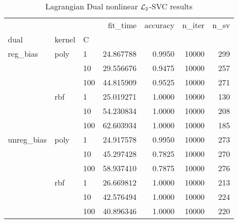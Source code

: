 \begin{table}[H]
\centering
\caption{Lagrangian Dual nonlinear $\protect \mathcal{L}_2$-SVC results}
\label{nonlinear_lagrangian_dual_l2_svc_cv_results}
\begin{tabular}{lllrrrr}
\toprule
           &     &     &   fit\_time &  accuracy &  n\_iter &  n\_sv \\
dual & kernel & C &            &           &         &       \\
\midrule
reg\_bias & poly & 1   &  24.867788 &    0.9950 &   10000 &   299 \\
           &     & 10  &  29.556676 &    0.9475 &   10000 &   257 \\
           &     & 100 &  44.815909 &    0.9525 &   10000 &   271 \\
           & rbf & 1   &  25.019271 &    1.0000 &   10000 &   130 \\
           &     & 10  &  54.230834 &    1.0000 &   10000 &   208 \\
           &     & 100 &  62.603934 &    1.0000 &   10000 &   185 \\
unreg\_bias & poly & 1   &  24.917578 &    0.9950 &   10000 &   273 \\
           &     & 10  &  45.297428 &    0.7825 &   10000 &   270 \\
           &     & 100 &  58.937410 &    0.7875 &   10000 &   276 \\
           & rbf & 1   &  26.669812 &    1.0000 &   10000 &   213 \\
           &     & 10  &  42.576494 &    1.0000 &   10000 &   224 \\
           &     & 100 &  40.896346 &    1.0000 &   10000 &   220 \\
\bottomrule
\end{tabular}
\end{table}
